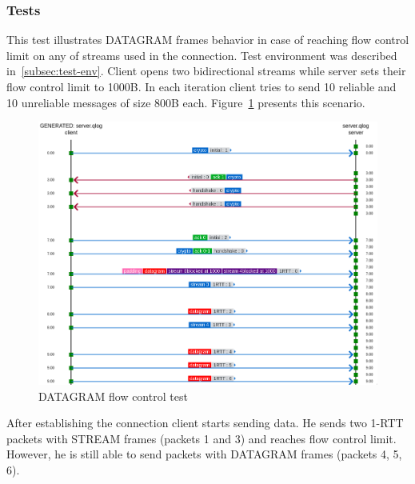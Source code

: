 \subsubsection{Tests}
This test illustrates DATAGRAM frames behavior in case of reaching flow control limit on any of streams used in the connection.
Test environment was described in~\ref{subsec:test-env}.
Client opens two bidirectional streams while server sets their flow control limit to 1000B\@.
In each iteration client tries to send 10 reliable and 10 unreliable messages of size 800B each.
Figure~\ref{fig:dgram_flow_control} presents this scenario.

\begin{figure}
    \centering
    \includegraphics[width=\textwidth]{img/__09__datagrams/dgram_flow_control.png}
    \caption{DATAGRAM flow control test}
    \label{fig:dgram_flow_control}
\end{figure}

After establishing the connection client starts sending data.
He sends two 1-RTT packets with STREAM frames (packets 1 and 3) and reaches flow control limit.
However, he is still able to send packets with DATAGRAM frames (packets 4, 5, 6).


